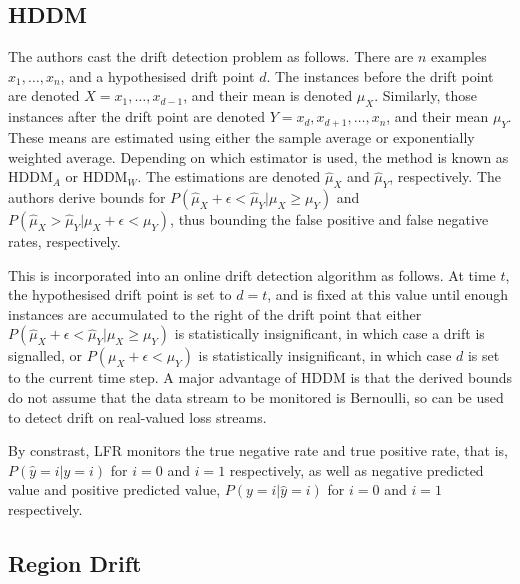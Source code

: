 \subsection{HDDM}

The authors cast the drift detection problem as follows. There are $n$ examples $x_1,\dots,x_n$, and a hypothesised drift point $d$. The instances before the drift point are denoted $X=x_1,\dots,x_{d-1}$, and their mean is denoted $\mu_X$. Similarly, those instances after the drift point are denoted $Y=x_d,x_{d+1},\dots,x_n$, and their mean $\mu_Y$. These means are estimated using either the sample average or exponentially weighted average. Depending on which estimator is used, the method is known as HDDM$_A$ or HDDM$_W$. The estimations are denoted $\hat{\mu}_X$ and $\hat{\mu}_Y$, respectively. The authors derive bounds for $P(\hat{\mu}_X+\epsilon < \hat{\mu}_Y|\mu_X \ge \mu_Y)$ and $P(\hat{\mu}_X > \hat{\mu}_Y|\mu_X+\epsilon < \mu_Y)$, thus bounding the false positive and false negative rates, respectively.

This is incorporated into an online drift detection algorithm as follows. At time $t$, the hypothesised drift point is set to $d=t$, and is fixed at this value until enough instances are accumulated to the right of the drift point that either $P(\hat{\mu}_X+\epsilon < \hat{\mu}_Y|\mu_X \ge \mu_Y)$ is statistically insignificant, in which case a drift is signalled, or $P(\mu_X+\epsilon < \mu_Y)$ is statistically insignificant, in which case $d$ is set to the current time step. A major advantage of HDDM is that the derived bounds do not assume that the data stream to be monitored is Bernoulli, so can be used to detect drift on real-valued loss streams.


By constrast, LFR monitors the true negative rate and true positive rate, that is, $P(\hat{y}=i|y=i)$ for $i=0$ and $i=1$ respectively, as well as negative predicted value and positive predicted value, $P(y=i|\hat{y}=i)$ for $i=0$ and $i=1$ respectively. 





\subsection{Region Drift}

